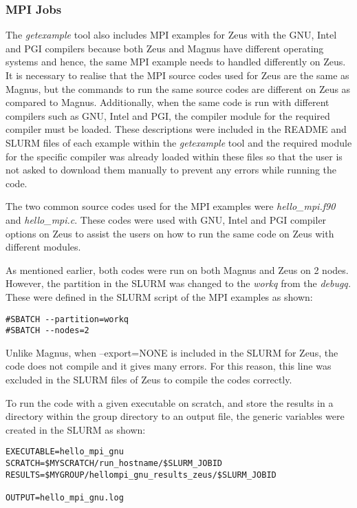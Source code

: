 \subsubsection{MPI Jobs}

The \emph{getexample} tool also includes MPI examples for Zeus with the GNU, Intel and PGI compilers because both Zeus and Magnus have different operating systems 
and hence, the same MPI example needs to handled differently on Zeus. It is necessary to realise that the MPI source codes used for Zeus are the same
as Magnus, but the commands to run the same source codes are different on Zeus as compared to Magnus. Additionally, when the same code is run 
with different compilers such as GNU, Intel and PGI, the compiler module for the required compiler must be loaded. These descriptions were included in
the README and SLURM files of each example within the \emph{getexample} tool and the required module for the specific compiler was already loaded within these 
files so that the user is not asked to download them manually to prevent any errors while running the code.

The two common source codes used for the MPI examples were \emph{hello\_mpi.f90} and \emph{hello\_mpi.c}. These codes were used with GNU, Intel and PGI 
compiler options on Zeus to assist the users on how to run the same code on Zeus with different modules.

As mentioned earlier, both codes were run on both Magnus and Zeus on 2 nodes. However, the partition in the SLURM was changed to the \emph{workq} from 
the \emph{debugq.} These were defined in the SLURM script of the MPI examples as shown: 

\begin{tcolorbox}
\begin{Verbatim}[fontsize=\scriptsize]
#SBATCH --partition=workq
#SBATCH --nodes=2
\end{Verbatim}
\end{tcolorbox}

Unlike Magnus, when --export=NONE is included in the SLURM for Zeus, the code does not compile and it gives many errors. For this reason, this line was
excluded in the SLURM files of Zeus to compile the codes correctly.

To run the code with a given executable on scratch, and store the results in a directory within the group directory to an output file, the generic 
variables were created in the SLURM as shown:

\begin{tcolorbox}
\begin{Verbatim}[fontsize=\scriptsize]
EXECUTABLE=hello_mpi_gnu
SCRATCH=$MYSCRATCH/run_hostname/$SLURM_JOBID
RESULTS=$MYGROUP/hellompi_gnu_results_zeus/$SLURM_JOBID

OUTPUT=hello_mpi_gnu.log
\end{Verbatim}
\end{tcolorbox}


